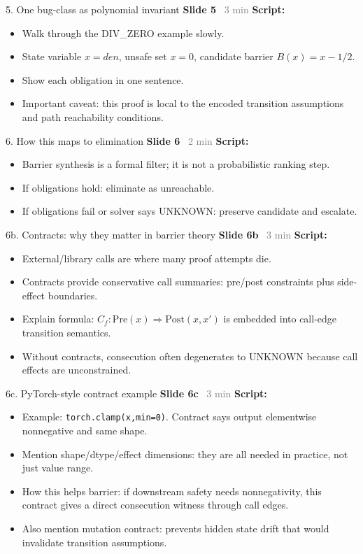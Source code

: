 \documentclass[aspectratio=169]{beamer}
\newcommand{\syncline}[2]{\textbf{#1} \hfill \textcolor{gray}{#2}}
\begin{document}
\begin{frame}{5. One bug-class as polynomial invariant}
\syncline{Slide 5}{~3 min}
\textbf{Script:}
\begin{itemize}
  \item Walk through the DIV\_ZERO example slowly.
  \item State variable \(x=den\), unsafe set \(x=0\), candidate barrier \(B(x)=x-1/2\).
  \item Show each obligation in one sentence.
  \item Important caveat: this proof is local to the encoded transition assumptions and path reachability conditions.
\end{itemize}
\end{frame}

\begin{frame}{6. How this maps to elimination}
\syncline{Slide 6}{~2 min}
\textbf{Script:}
\begin{itemize}
  \item Barrier synthesis is a formal filter; it is not a probabilistic ranking step.
  \item If obligations hold: eliminate as unreachable.
  \item If obligations fail or solver says UNKNOWN: preserve candidate and escalate.
\end{itemize}
\end{frame}

\begin{frame}{6b. Contracts: why they matter in barrier theory}
\syncline{Slide 6b}{~3 min}
\textbf{Script:}
\begin{itemize}
  \item External/library calls are where many proof attempts die.
  \item Contracts provide conservative call summaries: pre/post constraints plus side-effect boundaries.
  \item Explain formula: \(C_f: \text{Pre}(x) \Rightarrow \text{Post}(x,x')\) is embedded into call-edge transition semantics.
  \item Without contracts, consecution often degenerates to UNKNOWN because call effects are unconstrained.
\end{itemize}
\end{frame}

\begin{frame}{6c. PyTorch-style contract example}
\syncline{Slide 6c}{~3 min}
\textbf{Script:}
\begin{itemize}
  \item Example: \texttt{torch.clamp(x,min=0)}. Contract says output elementwise nonnegative and same shape.
  \item Mention shape/dtype/effect dimensions: they are all needed in practice, not just value range.
  \item How this helps barrier: if downstream safety needs nonnegativity, this contract gives a direct consecution witness through call edges.
  \item Also mention mutation contract: prevents hidden state drift that would invalidate transition assumptions.
\end{itemize}
\end{frame}
\end{document}
